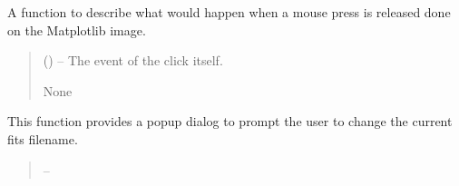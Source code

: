 \documentclass[letterpaper,11pt,english]{sphinxmanual}
\begin{document}
\begin{savenotes}
\begin{fulllineitems}
\begin{savenotes}\begin{fulllineitems}
\label{\detokenize{code/opihiexarata.gui.selector:opihiexarata.gui.selector.TargetSelectorWindow.__connect_matplotlib_mouse_release_event}}
\pysigstartsignatures
{}
\pysigstopsignatures
\sphinxAtStartPar
A function to describe what would happen when a mouse press is
released done on the Matplotlib image.
\begin{quote}\begin{description}
\sphinxAtStartPar
{} () – The event of the click itself.

\sphinxAtStartPar
None

\end{description}\end{quote}

\end{fulllineitems}\end{savenotes}


\begin{savenotes}\begin{fulllineitems}
\label{\detokenize{code/opihiexarata.gui.selector:opihiexarata.gui.selector.TargetSelectorWindow.__connect_push_button_change_current_filename}}
\pysigstartsignatures
{}
\pysigstopsignatures
\sphinxAtStartPar
This function provides a popup dialog to prompt the user to change
the current fits filename.
\begin{quote}\begin{description}
\sphinxAtStartPar
{} – 


\end{description}
\end{quote}
\end{fulllineitems}
\end{savenotes}
\end{fulllineitems}
\end{savenotes}
\end{document}
